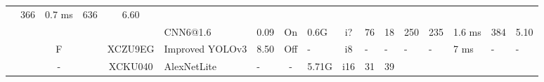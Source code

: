 \begin{table}
\begin{adjustbox}{totalheight=\baselineskip,}
\begin{tabular}{ccccclp{2em}cp{3em}cp{2em}p{4em}p{3em}p{3.5em}p{3.5em}p{2.5em}p{3em}}
                                                   &\multirow{1}{*}{366}
                                                       &\multirow{1}{*}{0.7 ms}
                                                           &\multirow{1}{*}{636}
                                                               &\multirow{1}{*}{6.60}\\
   &   &   &   &   &\multirow{1}{*}{CNN6@1.6}
                       &\multirow{1}{*}{0.09}
                           &\multirow{1}{*}{On}
                               &\multirow{1}{*}{0.6G}
                                   &\multirow{1}{*}{i?}
                                       &\multirow{1}{*}{76}
                                           &\multirow{1}{*}{18}
                                               &\multirow{1}{*}{250}
                                                   &\multirow{1}{*}{235}
                                                       &\multirow{1}{*}{1.6 ms}
                                                           &\multirow{1}{*}{384}
                                                               &\multirow{1}{*}{5.10}\\
\cmidrule{3-17}
   &   &\multirow{1}{*}{F}
           &\multirow{1}{*}{\cite{wuDesignImplementationRemote2021}}
               &\multirow{1}{*}{XCZU9EG}
                   &\multirow{1}{*}{Improved YOLOv3}
                       &\multirow{1}{*}{8.50}
                           &\multirow{1}{*}{Off}
                               &\multirow{1}{*}{-}
                                   &\multirow{1}{*}{i8}
                                       &\multirow{1}{*}{-}
                                           &\multirow{1}{*}{-}
                                               &\multirow{1}{*}{-}
                                                   &\multirow{1}{*}{-}
                                                       &\multirow{1}{*}{7 ms}
                                                           &\multirow{1}{*}{-}
                                                               &\multirow{1}{*}{-}\\
\cmidrule{3-17}
   &   &\multirow{2}{*}{-}
           &\multirow{2}{*}{\cite{nerisFPGABasedImplementationCNN2022a}}
               &\multirow{2}{*}{XCKU040}
                   &\multirow{1}{*}{AlexNetLite}
                       &\multirow{1}{*}{-}
                           &\multirow{1}{*}{-}
                               &\multirow{1}{*}{5.71G}
                                   &\multirow{1}{*}{i16}
                                       &\multirow{1}{*}{31}
                                           &\multirow{1}{*}{39}

\end{tabular}
\end{adjustbox}
\end{table}

